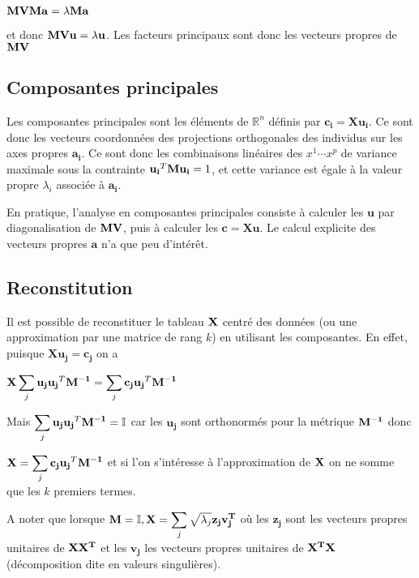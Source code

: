 \documentclass[letterpaper,10pt,french]{sphinxmanual}
\begin{document}
\sphinxAtStartPar
\({\bf MVM}\mathbf{a}=\lambda {\bf M}\mathbf{a}\)

\sphinxAtStartPar
et donc \({\bf MV}\mathbf{u}=\lambda \mathbf{u}\).  Les facteurs principaux sont donc les vecteurs propres de \({\bf MV}\)


\subsection{Composantes principales}
\label{\detokenize{acp:composantes-principales}}
\sphinxAtStartPar
Les composantes principales sont les éléments de \(\mathbb{R}^n\) définis par \(\mathbf{c_i}=\mathbf{Xu_i}\). Ce sont donc les vecteurs coordonnées des projections orthogonales des individus sur les axes propres \(\mathbf{a_i}\).  Ce sont donc les combinaisons linéaires des \(x^1\cdots x^p\) de variance maximale sous la contrainte \(\mathbf{u_i}^T{\bf M}\mathbf{u_i}=1\), et cette variance est égale à la valeur propre \(\lambda_i\) associée à \(\mathbf{a_i}\).

\sphinxAtStartPar
En pratique, l’analyse en composantes principales consiste à calculer les \(\mathbf{u}\) par diagonalisation de \({\bf MV}\), puis à calculer les \(\mathbf{c}=\mathbf{Xu}\). Le calcul explicite des vecteurs propres \(\mathbf{a}\) n’a que peu d’intérêt.


\subsection{Reconstitution}
\label{\detokenize{acp:reconstitution}}
\sphinxAtStartPar
Il est possible de reconstituer le tableau \({\bf X}\) centré des données (ou une approximation par une matrice de rang \(k\)) en utilisant les composantes. En effet, puisque \(\mathbf{Xu_j}=\mathbf{c_j}\) on a

\sphinxAtStartPar
\({\bf X}\displaystyle\sum_j \mathbf{u_j}\mathbf{u_j}^T{\bf M^{-1}} = \displaystyle\sum_j\mathbf{c_j}\mathbf{u_j}^T{\bf M^{-1}}\)

\sphinxAtStartPar
Mais \(\displaystyle\sum_j \mathbf{u_j}\mathbf{u_j}^T{\bf M^{-1}}=\mathbb{I}\)  car les \(\mathbf{u_j}\) sont orthonormés pour la métrique \({\bf M^{-1}}\) donc

\sphinxAtStartPar
\({\bf X}=\displaystyle\sum_j\mathbf{c_j}\mathbf{u_j}^T{\bf M^{-1}}\)
et si l’on s’intéresse à l’approximation de \({\bf X}\) on ne somme que les \(k\) premiers termes.

\sphinxAtStartPar
A noter que lorsque \({\bf M}=\mathbb{I}, {\bf X}= \displaystyle\sum_j\sqrt{\lambda_j}\mathbf{z_j}\mathbf{v_j^T}\) où les \(\mathbf{z_j}\) sont les vecteurs propres unitaires de \({\bf XX^T}\) et les \(\mathbf{v_j}\) les vecteurs propres unitaires de \({\bf X^TX}\) (décomposition dite en valeurs singulières).
\end{document}

